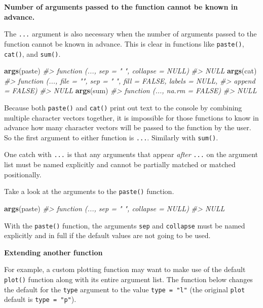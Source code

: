 \documentclass[]{book}
\newenvironment{Shaded}{\begin{snugshade}}{\end{snugshade}}
\newcommand{\KeywordTok}[1]{\textcolor[rgb]{0.13,0.29,0.53}{\textbf{#1}}}
\newcommand{\CommentTok}[1]{\textcolor[rgb]{0.56,0.35,0.01}{\textit{#1}}}
\newcommand{\NormalTok}[1]{#1}
\begin{document}
\textbf{Number of arguments passed to the function cannot be known in
advance.}

The \texttt{...} argument is also necessary when the number of arguments
passed to the function cannot be known in advance. This is clear in
functions like \texttt{paste()}, \texttt{cat()}, and \texttt{sum()}.

\begin{Shaded}
\begin{Highlighting}[]
\KeywordTok{args}\NormalTok{(paste)}
\CommentTok{#> function (..., sep = " ", collapse = NULL) }
\CommentTok{#> NULL}
\KeywordTok{args}\NormalTok{(cat)}
\CommentTok{#> function (..., file = "", sep = " ", fill = FALSE, labels = NULL, }
\CommentTok{#>     append = FALSE) }
\CommentTok{#> NULL}
\KeywordTok{args}\NormalTok{(sum)}
\CommentTok{#> function (..., na.rm = FALSE) }
\CommentTok{#> NULL}
\end{Highlighting}
\end{Shaded}

Because both \texttt{paste()} and \texttt{cat()} print out text to the
console by combining multiple character vectors together, it is
impossible for those functions to know in advance how many character
vectors will be passed to the function by the user. So the first
argument to either function is \texttt{...}. Similarly with
\texttt{sum()}.

One catch with \texttt{...} is that any arguments that appear
\emph{after} \texttt{...} on the argument list must be named explicitly
and cannot be partially matched or matched positionally.

Take a look at the arguments to the \texttt{paste()} function.

\begin{Shaded}
\begin{Highlighting}[]
\KeywordTok{args}\NormalTok{(paste)}
\CommentTok{#> function (..., sep = " ", collapse = NULL) }
\CommentTok{#> NULL}
\end{Highlighting}
\end{Shaded}

With the \texttt{paste()} function, the arguments \texttt{sep} and
\texttt{collapse} must be named explicitly and in full if the default
values are not going to be used.

\textbf{Extending another function}

For example, a custom plotting function may want to make use of the
default \texttt{plot()} function along with its entire argument list.
The function below changes the default for the \texttt{type} argument to
the value \texttt{type\ =\ "l"} (the original \texttt{plot} default is
\texttt{type\ =\ "p"}).
\end{document}
